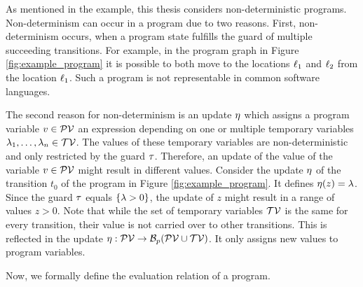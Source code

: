 As mentioned in the example, this thesis considers non-deterministic programs.
Non-determinism can occur in a program due to two reasons.
First, non-determinism occurs, when a program state fulfills the guard of multiple succeeding transitions. 
For example, in the program graph in Figure \ref{fig:example_program} it is possible to both move to the locations $\ell_1$ and $\ell_2$ from the location $\ell_1$.
Such a program is not representable in common software languages.

The second reason for non-determinism is an update $\eta$ which assigns a program variable $v \in \mathcal{PV}$ an expression depending on one or multiple temporary variables $\lambda_1, \dots, \lambda_n \in \mathcal{TV}$.
The values of these temporary variables are non-deterministic and only restricted by the guard $\tau$.
Therefore, an update of the value of the variable $v \in \mathcal{PV}$ might result in different values.
Consider the update $\eta$ of the transition $t_0$ of the program in Figure \ref{fig:example_program}.
It defines $\eta(z) = \lambda$.
Since the guard $\tau$ equals $\lbrace \lambda > 0 \rbrace$, the update of $z$ might result in a range of values $z > 0$. 
Note that while the set of temporary variables $\mathcal{TV}$ is the same for every transition, their value is not carried over to other transitions.
This is reflected in the update $\eta: \mathcal{PV} \rightarrow \mathcal{B}_p(\mathcal{PV} \cup \mathcal{TV})$.
It only assigns new values to program variables.

Now, we formally define the evaluation relation of a program.

